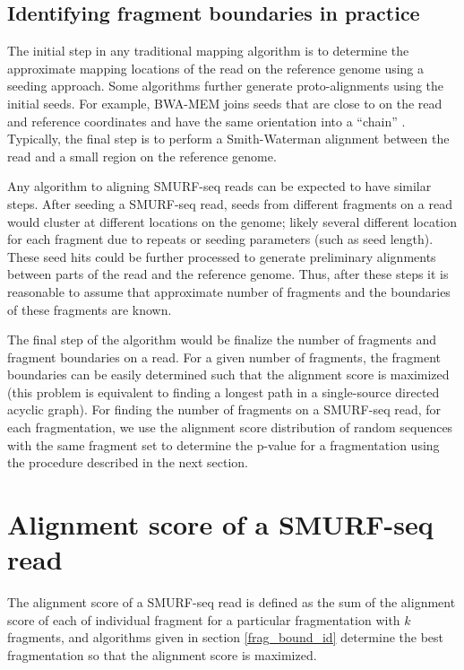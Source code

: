 \subsection{Identifying fragment boundaries in practice}
The initial step in any traditional mapping algorithm is to determine
the approximate mapping locations of the read on the reference genome
using a seeding approach.
%
Some algorithms further generate proto-alignments using the initial
seeds.  For example, BWA-MEM joins seeds that are close to on the read
and reference coordinates and have the same orientation into a ``chain''
\citep{li2013aligning}.
%
Typically, the final step is to perform a Smith-Waterman alignment
between the read and a small region on the reference genome.

Any algorithm to aligning SMURF-seq reads can be expected to have
similar steps. After seeding a SMURF-seq read, seeds from different
fragments on a read would cluster at different locations on the genome;
likely several different location for each fragment due to repeats or
seeding parameters (such as seed length).
%
These seed hits could be further processed to generate preliminary
alignments between parts of the read and the reference genome.
%
Thus, after these steps it is reasonable to assume that approximate
number of fragments and the boundaries of these fragments are known.

The final step of the algorithm would be finalize the number of
fragments and fragment boundaries on a read. For a given number of
fragments, the fragment boundaries can be easily determined such that
the alignment score is maximized (this problem is equivalent to finding
a longest path in a single-source directed acyclic graph).
%
For finding the number of fragments on a SMURF-seq read, for each
fragmentation, we use the alignment score distribution of random
sequences with the same fragment set to determine the p-value for a
fragmentation using the procedure described in the next section.



\section{Alignment score of a SMURF-seq read}
\label{smurf_aln_score}
The alignment score of a SMURF-seq read is defined as the sum of the
alignment score of each of individual fragment for a particular
fragmentation with $k$ fragments, and algorithms given in section
\ref{frag_bound_id} determine the best fragmentation so that the
alignment score is maximized.

